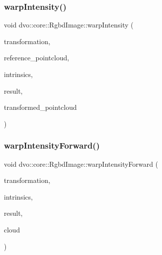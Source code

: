 \subsubsection{\texorpdfstring{warp\+Intensity()}{warpIntensity()}}
{\footnotesize\ttfamily void dvo\+::core\+::\+Rgbd\+Image\+::warp\+Intensity (\begin{DoxyParamCaption}\item[{const \mbox{\hyperlink{namespacedvo_1_1core_af89a8f837f3ae51ed196b7988e59e53d}{Affine\+Transform}} \&}]{transformation,  }\item[{const \mbox{\hyperlink{structdvo_1_1core_1_1_rgbd_image_a56820965eb98427d06e6733fe333cdc5}{Point\+Cloud}} \&}]{reference\+\_\+pointcloud,  }\item[{const \mbox{\hyperlink{structdvo_1_1core_1_1_intrinsic_matrix}{Intrinsic\+Matrix}} \&}]{intrinsics,  }\item[{\mbox{\hyperlink{structdvo_1_1core_1_1_rgbd_image}{Rgbd\+Image}} \&}]{result,  }\item[{\mbox{\hyperlink{structdvo_1_1core_1_1_rgbd_image_a56820965eb98427d06e6733fe333cdc5}{Point\+Cloud}} \&}]{transformed\+\_\+pointcloud }\end{DoxyParamCaption})}

\mbox{\label{structdvo_1_1core_1_1_rgbd_image_a3da7245dc71cced4c4ea2d3e877a45b2}} 
\subsubsection{\texorpdfstring{warp\+Intensity\+Forward()}{warpIntensityForward()}}
{\footnotesize\ttfamily void dvo\+::core\+::\+Rgbd\+Image\+::warp\+Intensity\+Forward (\begin{DoxyParamCaption}\item[{const \mbox{\hyperlink{namespacedvo_1_1core_af89a8f837f3ae51ed196b7988e59e53d}{Affine\+Transform}} \&}]{transformation,  }\item[{const \mbox{\hyperlink{structdvo_1_1core_1_1_intrinsic_matrix}{Intrinsic\+Matrix}} \&}]{intrinsics,  }\item[{\mbox{\hyperlink{structdvo_1_1core_1_1_rgbd_image}{Rgbd\+Image}} \&}]{result,  }\item[{cv\+::\+Mat\+\_\+$<$ cv\+::\+Vec3d $>$ \&}]{cloud }\end{DoxyParamCaption})}

